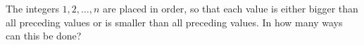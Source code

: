 The integers $1, 2, \ldots, n$ are placed in order, so that each value is either bigger than all preceding values or is smaller than all preceding values. In how many ways can this be done?
